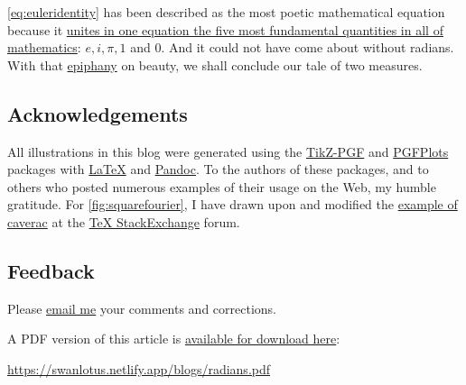 \documentclass[
  a4paper,
]{article}
\begin{document}
\cref{eq:euleridentity} has been described as the most poetic
mathematical equation because it
\href{https://www.livescience.com/51399-eulers-identity.html}{unites in
one equation the five most fundamental quantities in all of
mathematics}: \(e, i, \pi, 1\) and \(0\). And it could not have come
about without radians. With that
\href{https://www.thefreedictionary.com/epiphany}{epiphany} on beauty,
we shall conclude our tale of two measures.

\hypertarget{acknowledgements}{%
\subsection{Acknowledgements}\label{acknowledgements}}

All illustrations in this blog were generated using the
\href{https://github.com/pgf-tikz/pgf}{TikZ-PGF} and
\href{https://pgfplots.sourceforge.net/}{PGFPlots} packages with
\href{https://www.latex-project.org/}{LaTeX} and
\href{https://pandoc.org/}{Pandoc}. To the authors of these packages,
and to others who posted numerous examples of their usage on the Web, my
humble gratitude. For \cref{fig:squarefourier}, I have drawn upon and
modified the \href{https://tex.stackexchange.com/a/429505/1636}{example
of caverac} at the \href{https://tex.stackexchange.com/}{TeX
StackExchange} forum.

\hypertarget{feedback}{%
\subsection{Feedback}\label{feedback}}

Please \href{mailto:feedback.swanlotus@gmail.com}{email me} your
comments and corrections.

\noindent A PDF version of this article is
\href{./radians.pdf}{available for download here}:

\begin{small}

\begin{sffamily}

\url{https://swanlotus.netlify.app/blogs/radians.pdf}

\end{sffamily}

\end{small}
\end{document}
